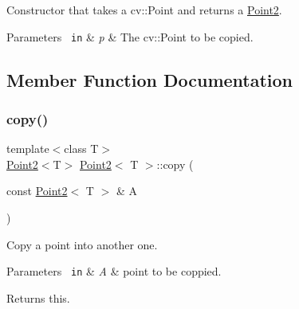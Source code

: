 Constructor that takes a cv\+::\+Point and returns a \mbox{\hyperlink{class_point2}{Point2}}. 


\begin{DoxyParams}[1]{Parameters}
\mbox{\texttt{ in}}  & {\em p} & The cv\+::\+Point to be copied. \\
\hline
\end{DoxyParams}


\subsection{Member Function Documentation}
\mbox{\label{class_point2_abf5cfefe8e75dda02f681fc8d74c2c39}} 
\subsubsection{\texorpdfstring{copy()}{copy()}}
{\footnotesize\ttfamily template$<$class T$>$ \\
\mbox{\hyperlink{class_point2}{Point2}}$<$T$>$ \mbox{\hyperlink{class_point2}{Point2}}$<$ T $>$\+::copy (\begin{DoxyParamCaption}\item[{const \mbox{\hyperlink{class_point2}{Point2}}$<$ T $>$ \&}]{A }\end{DoxyParamCaption})\hspace{0.3cm}{\ttfamily [inline]}}



Copy a point into another one. 


\begin{DoxyParams}[1]{Parameters}
\mbox{\texttt{ in}}  & {\em A} & point to be coppied. \\
\hline
\end{DoxyParams}
\begin{DoxyReturn}{Returns}
this. 
\end{DoxyReturn}
\mbox{\label{class_point2_a5f50f8f110af78415a56b0c32c2c8b8f}} 
